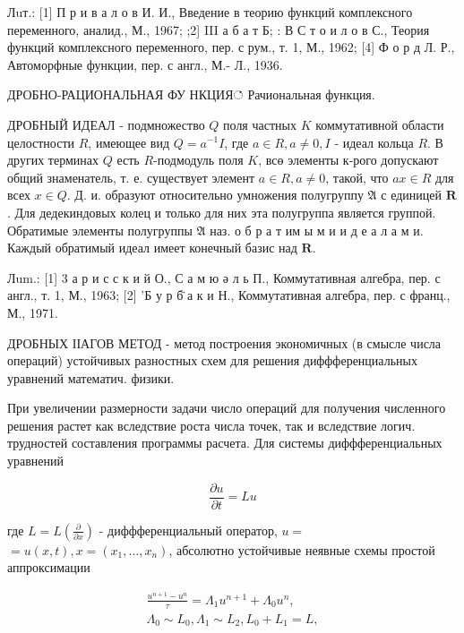 \documentclass[10pt]{article}
\begin{document}
Лuт.: [1] П р и в а л о в И. И., Введение в теорию функций комплексного переменного, аналид., М., 1967; ;2] III а б а т Б; : В С т о и л о в С., Теория функций комплексного переменного, пер. с рум., т. 1, М., 1962; [4] Ф о р д Л. Р., Автоморфные функции, пер. с англ., М.- Л., 1936.



ДРОБНО-РАЦИОНАЛЬНАЯ ФУ НКЦИЯ் Рачиональная функция.



ДРОБНЫЙ ИДЕАЛ - подмножество $Q$ поля частных $K$ коммутативной области целостности $R$, имеющее вид $Q=a^{-1} I$, где $a \in R, a \neq 0, I$ - идеал кольца $R$. В других терминах $Q$ есть $R$-подмодуль поля $K$, всө элементы к-рого допускают общий знаменатель, т. е. существует элемент $a \in R, a \neq 0$, такой, что $a x \in R$ для всех $x \in Q$. Д. и. образуют относительно умножения полугруппу $\mathfrak{A}$ с единицей $\boldsymbol{R}$. Для дедекиндовых колец и только для них эта полугруппа является группой. Обратимые элементы полугруппы $\mathfrak{A}$ наз. о б р а т им ы м и и д е а л а м и. Каждый обратимый идеал имеет конечный базис над $\boldsymbol{R}$.



Лum.: [1] 3 а р и с с к и й О., С а м ю ә л ь П., Коммутативная алгебра, пер. с англ., т. 1, М., 1963; [2] 'Б у р б̈ а к и Н., Коммутативная алгебра, пер. с франц., М., 1971.



ДРОБНЫХ ІІАГОВ МЕТОД - метод построения экономичных (в смысле числа операций) устойчивых разностных схем для решения диффференциальных уравнений математич. физики.



При увеличении размерности задачи число операций для получения численного решения растет как вследствие роста числа точек, так и вследствие логич. трудностей составления программы расчета. Для системы диффференциальных уравнений



\[

\frac{\partial u}{\partial t}=L u

\]



где $L=L\left(\frac{\partial}{\partial x}\right)$ - диффференциальный оператор, $u=$ $=u(x, t), x=\left(x_{1}, \ldots, x_{n}\right)$, абсолютно устойчивые неявные схемы простой аппроксимации



\[

\begin{gathered}

\frac{u^{n+1}-u^{n}}{\tau}=\Lambda_{1} u^{n+1}+\Lambda_{0} u^{n}, \\

\Lambda_{0} \sim L_{0}, \Lambda_{1} \sim L_{2}, L_{0}+L_{1}=L,

\end{gathered}

\]
\end{document}
